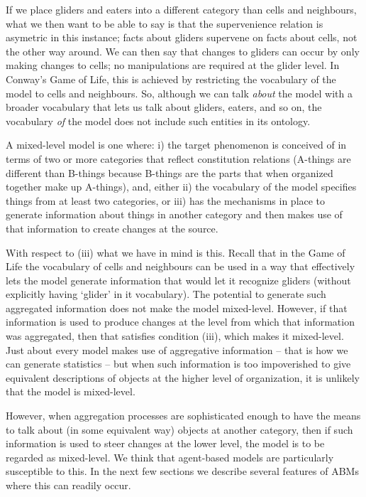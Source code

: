 \documentclass[11pt]{article}
\begin{document}
If we place gliders and eaters into a different category than cells and neighbours, what we then want to be able to say is that the supervenience relation is asymetric in this instance; facts about gliders supervene on facts about cells, not the other way around. We can then say that changes to gliders can occur by only making changes to cells; no manipulations are required at the glider level.  In Conway's Game of Life, this is achieved by restricting the vocabulary of the model to cells and neighbours. So, although we can talk \emph{about} the model with a broader vocabulary that lets us talk about gliders, eaters, and so on, the vocabulary \emph{of} the model does not include such entities in its ontology. 

A mixed-level model is one where: i) the target phenomenon is conceived of in terms of two or more categories that reflect constitution relations (A-things are different than B-things because B-things are the parts that when organized together make up A-things), and, either ii) the vocabulary of the model specifies things from at least two categories, or iii) has the mechanisms in place to generate information about things in another category and then makes use of that information to create changes at the source.

With respect to (iii) what we have in mind is this. Recall that in the Game of Life the vocabulary of cells and neighbours can be used in a way that effectively lets the model generate information that would let it recognize gliders (without explicitly having `glider' in it vocabulary). The potential to generate such aggregated information does not make the model mixed-level. However, if that information is used to produce changes at the level from which that information was aggregated, then that satisfies condition (iii), which makes it mixed-level. Just about every model makes use of aggregative information -- that is how we can generate statistics -- but when such information is too impoverished to give equivalent descriptions of objects at the higher level of organization, it is unlikely that the model is mixed-level. 

However, when aggregation processes are sophisticated enough to have the means to talk about (in some equivalent way) objects at another category, then if such information is used to steer changes at the lower level, the model is to be regarded as mixed-level. We think that agent-based models are particularly susceptible to this. In the next few sections we describe several features of ABMs where this can readily occur.
\end{document}
